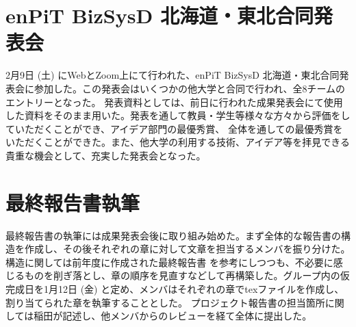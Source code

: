 \section{enPiT BizSysD 北海道・東北合同発表会}
2月9日 (土) にWebとZoom上にて行われた、enPiT BizSysD 北海道・東北合同発表会に参加した。この発表会はいくつかの他大学と合同で行われ、全8チームのエントリーとなった。
発表資料としては、前日に行われた成果発表会にて使用した資料をそのまま用いた。発表を通して教員・学生等様々な方々から評価をしていただくことができ、アイデア部門の最優秀賞、
全体を通しての最優秀賞をいただくことができた。また、他大学の利用する技術、アイデア等を拝見できる貴重な機会として、充実した発表会となった。

\section{最終報告書執筆}
最終報告書の執筆には成果発表会後に取り組み始めた。まず全体的な報告書の構造を作成し、その後それぞれの章に対して文章を担当するメンバを振り分けた。構造に関しては前年度に作成された最終報告書
を参考にしつつも、不必要に感じるものを削ぎ落とし、章の順序を見直すなどして再構築した。グループ内の仮完成日を1月12日 (金) と定め、メンバはそれぞれの章でtexファイルを作成し、割り当てられた章を執筆することとした。
プロジェクト報告書の担当箇所に関しては稲田が記述し、他メンバからのレビューを経て全体に提出した。
